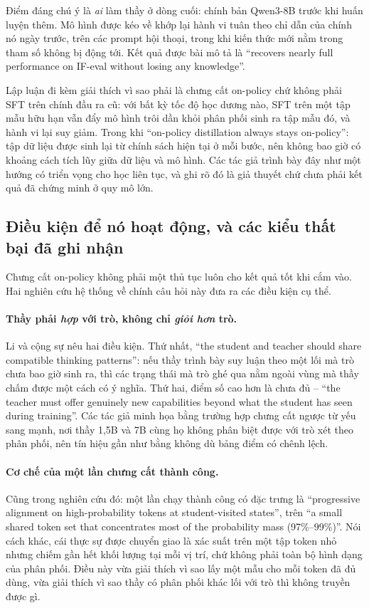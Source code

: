 Điểm đáng chú ý là \emph{ai} làm thầy ở dòng cuối: chính bản Qwen3-8B trước khi huấn luyện thêm. Mô hình được kéo về khớp lại hành vi tuân theo chỉ dẫn của chính nó ngày trước, trên các prompt hội thoại, trong khi kiến thức mới nằm trong tham số không bị động tới. Kết quả được bài mô tả là ``recovers nearly full performance on IF-eval without losing any knowledge''.

Lập luận đi kèm giải thích vì sao phải là chưng cất on-policy chứ không phải SFT trên chính đầu ra cũ: với bất kỳ tốc độ học dương nào, SFT trên một tập mẫu hữu hạn vẫn đẩy mô hình trôi dần khỏi phân phối sinh ra tập mẫu đó, và hành vi lại suy giảm. Trong khi ``on-policy distillation always stays on-policy'': tập dữ liệu được sinh lại từ chính sách hiện tại ở mỗi bước, nên không bao giờ có khoảng cách tích lũy giữa dữ liệu và mô hình. Các tác giả trình bày đây như một hướng có triển vọng cho học liên tục, và ghi rõ đó là giả thuyết chứ chưa phải kết quả đã chứng minh ở quy mô lớn.

\subsection{Điều kiện để nó hoạt động, và các kiểu thất bại đã ghi nhận}
\label{ssec:opd_conditions}

Chưng cất on-policy không phải một thủ tục luôn cho kết quả tốt khi cắm vào. Hai nghiên cứu hệ thống về chính câu hỏi này đưa ra các điều kiện cụ thể.

\paragraph{Thầy phải \emph{hợp} với trò, không chỉ \emph{giỏi hơn} trò.} Li và cộng sự \cite{li2026rethinkingopd} nêu hai điều kiện. Thứ nhất, ``the student and teacher should share compatible thinking patterns'': nếu thầy trình bày suy luận theo một lối mà trò chưa bao giờ sinh ra, thì các trạng thái mà trò ghé qua nằm ngoài vùng mà thầy chấm được một cách có ý nghĩa. Thứ hai, điểm số cao hơn là chưa đủ -- ``the teacher must offer genuinely new capabilities beyond what the student has seen during training''. Các tác giả minh họa bằng trường hợp chưng cất ngược từ yếu sang mạnh, nơi thầy 1,5B và 7B cùng họ không phân biệt được với trò xét theo phân phối, nên tín hiệu gần như bằng không dù bảng điểm có chênh lệch.

\paragraph{Cơ chế của một lần chưng cất thành công.} Cũng trong nghiên cứu đó: một lần chạy thành công có đặc trưng là ``progressive alignment on high-probability tokens at student-visited states'', trên ``a small shared token set that concentrates most of the probability mass (97\%--99\%)''. Nói cách khác, cái thực sự được chuyển giao là xác suất trên một tập token nhỏ nhưng chiếm gần hết khối lượng tại mỗi vị trí, chứ không phải toàn bộ hình dạng của phân phối. Điều này vừa giải thích vì sao lấy một mẫu cho mỗi token đã đủ dùng, vừa giải thích vì sao thầy có phân phối khác lối với trò thì không truyền được gì.

